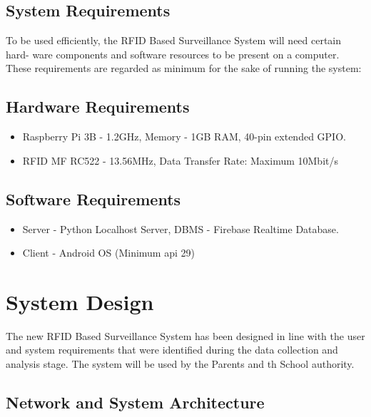 \subsection{System Requirements}
\par To be used efficiently, the RFID Based Surveillance System will need certain hard-
ware components and software resources to be present on a computer.\\
These requirements are regarded as minimum for the sake of running the system:

\subsectionfont{\normalsize}
\subsection*{Hardware Requirements}
\begin{itemize}
	\item Raspberry Pi 3B - 1.2GHz, Memory - 1GB RAM, 40-pin extended GPIO.
	\item RFID MF RC522 - 13.56MHz, Data Transfer Rate: Maximum 10Mbit/s 
\end{itemize}
\subsection*{Software Requirements}
\begin{itemize}
	\item Server - Python Localhost Server, DBMS - Firebase Realtime Database.
	\item Client - Android OS (Minimum api 29)
\end{itemize}
\subsectionfont{\large}

\section{System Design}
\par The new RFID Based Surveillance System has been designed in line with the
user and system requirements that were identified during the data collection and
analysis stage. The system will be used by the Parents and th School authority.

\subsection{Network and System Architecture}



